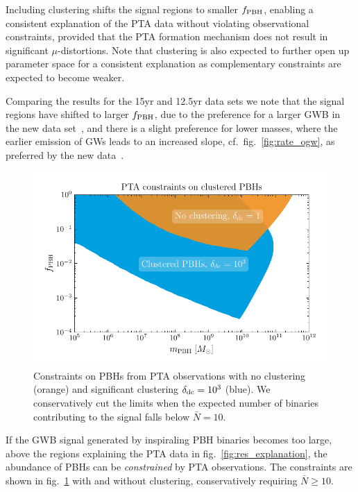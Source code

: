 Including clustering shifts the signal regions to smaller $f_{\mathrm{PBH}}$, enabling a consistent explanation of the \ac{PTA} data without violating observational constraints, provided that the \ac{PTA} formation  mechanism does not result in significant $\mu$-distortions. Note that clustering is also expected to further open up parameter space for a consistent explanation as complementary constraints are expected to become weaker.

Comparing the results for the 15yr and 12.5yr data sets we note that the signal regions have shifted to larger $f_{\mathrm{PBH}}$, due to the preference for a larger \ac{GWB} in the new  data set~\cite{NANOGrav:2020bcs,NANOGrav:2023gor}, and there is a slight preference for lower masses, where the earlier emission of GWs leads to an increased slope, cf.~fig.~\ref{fig:rate_ogw}, as preferred by the new data~\cite{NANOGrav:2023gor}.

\begin{figure}[t]
	\centering
	\includegraphics[width=\textwidth]{thesisplots/pbh/pbh_03}
	\caption{
		Constraints on \acp{PBH} from \ac{PTA} observations with no clustering (orange) and significant clustering $\delta_{\mathrm{dc}} = 10^3$ (blue). We conservatively cut the limits when the expected number of binaries contributing to the signal falls below $\bar{N} = 10$.}
	\label{fig:constraint}
\end{figure}

If the \ac{GWB} signal generated by inspiraling \ac{PBH} binaries becomes too large, above the regions  explaining the \ac{PTA} data in fig.~\ref{fig:res_explanation}, the abundance of \acp{PBH} can be \emph{constrained} by \ac{PTA} observations. The constraints are shown in fig.~\ref{fig:constraint} with and without clustering, conservatively requiring $\bar{N} \geq 10$.

